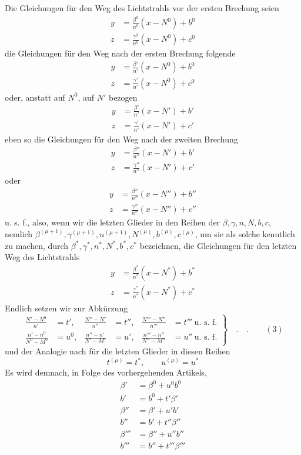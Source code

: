 Die Gleichungen für den Weg des Lichtstrahls vor der ersten Brechung seien
\[
\begin{aligned}
y&=\frac{\beta^0}{n^0}(x-N^0)+b^0\\
z&=\frac{\gamma^0}{n^0}(x-N^0)+c^0
\end{aligned}
\]
die Gleichungen für den Weg nach der ersten Brechung folgende
\[
\begin{aligned}
y&=\frac{\beta'}{n'}(x-N^0)+b^0\\
z&=\frac{\gamma'}{n'}(x-N^0)+c^0
\end{aligned}
\]
oder, anstatt auf $N^0$, auf $N'$ bezogen
\[
\begin{aligned}
y&=\frac{\beta'}{n'}(x-N')+b'\\
z&=\frac{\gamma'}{n'}(x-N')+c'
\end{aligned}
\]
eben so die Gleichungen für den Weg nach der zweiten Brechung
\[
\begin{aligned}
y&=\frac{\beta''}{n''}(x-N')+b'\\
z&=\frac{\gamma''}{n''}(x-N')+c'
\end{aligned}
\]
oder
\[
\begin{aligned}
y&=\frac{\beta''}{n''}(x-N'')+b''\\
z&=\frac{\gamma''}{n''}(x-N'')+c''
\end{aligned}
\]
u. s. f., also, wenn wir die letzten Glieder in den Reihen der $\beta,\gamma,n,N,b,c$, nemlich $\beta^{(\mu+1)},\gamma^{(\mu+1)},n^{(\mu+1)},N^{(\mu)},b^{(\mu)},c^{(\mu)}$, um sie als solche kenntlich zu machen, durch $\beta^*,\gamma^*,n^*,N^*,b^*,c^*$ bezeichnen, die Gleichungen für den letzten Weg des Lichtstrahls
\[
\begin{aligned}
y&=\frac{\beta^*}{n^*}(x-N^*)+b^*\\
z&=\frac{\gamma^*}{n^*}(x-N^*)+c^*
\end{aligned}
\]
Endlich setzen wir zur Abkürzung
\[
\left.\begin{aligned}
\frac{N'-N^0}{n'}&=t',&\frac{N''-N'}{n''}&=t'',&\frac{N'''-N''}{n'''}&=t'''\ \text{u. s. f.}\\
\frac{n'-n^0}{N^0-M^0}&=u^0,&\frac{n''-n'}{N'-M'}&=u',&\frac{n'''-n''}{N''-M''}&=u''\ \text{u. s. f.}
\end{aligned}\right\}\quad .\quad .\qquad (3)
\]
und der Analogie nach für die letzten Glieder in diesen Reihen
\[
t^{(\mu)}=t^*,\qquad u^{(\mu)}=u^*
\]
Es wird demnach, in Folge des vorhergehenden Artikels,
\[
\begin{aligned}
\beta'&=\beta^0+u^0b^0\\
b'&=b^0+t'\beta'\\
\beta''&=\beta'+u'b'\\
b''&=b'+t''\beta''\\
\beta'''&=\beta''+u''b''\\
b'''&=b''+t'''\beta'''
\end{aligned}
\]
